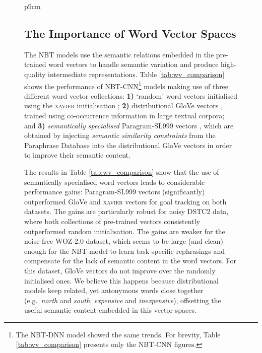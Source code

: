 \documentclass[11pt,a4paper]{article}
\begin{document}
\begin{figure}
{\begin{tabular}{p{9cm}}
\subsection{The Importance of Word Vector Spaces}

The NBT models use the semantic relations embedded in the pre-trained word vectors to handle semantic variation and produce high-quality intermediate representations. Table \ref{tab:wv_comparison} shows the performance of \textsc{NBT-CNN}\footnote{The \textsc{NBT-DNN} model showed the same trends. For brevity, Table \ref{tab:wv_comparison} presents only the \textsc{NBT-CNN} figures. } models making use of three different word vector collections: \textbf{1)} `random' word vectors initialised using the \textsc{xavier} initialisation \cite{Glorot:2010aistats}; \textbf{2)} distributional GloVe vectors \cite{Pennington:14}, trained using co-occurrence information in large textual corpora; and \textbf{3)} \emph{semantically specialised} Paragram-SL999 vectors \cite{Wieting:15}, which are obtained by injecting \emph{semantic similarity constraints} from the Paraphrase Database \cite{ppdb:13} into the distributional GloVe vectors in order to improve their semantic content.  

The results in Table \ref{tab:wv_comparison} show that the use of semantically specialised word vectors leads to considerable performance gains: Paragram-SL999 vectors (significantly) outperformed GloVe and \textsc{xavier} vectors for goal tracking on both datasets. The gains are particularly robust for noisy DSTC2 data, where both collections of pre-trained vectors consistently outperformed random initialisation. The gains are weaker for the noise-free WOZ 2.0 dataset, which seems to be large (and clean) enough for the NBT model to learn task-specific rephrasings and compensate for the lack of semantic content in the word vectors. For this dataset, GloVe vectors do not improve over the randomly initialised ones. We believe this happens because distributional models keep related, yet antonymous words close together (e.g.~\emph{north} and \emph{south}, \emph{expensive} and \emph{inexpensive}), offsetting the useful semantic content embedded in this vector spaces. 


\begin{table} \centering
{}
\end{table}
\end{tabular}}
\end{figure}
\end{document}
